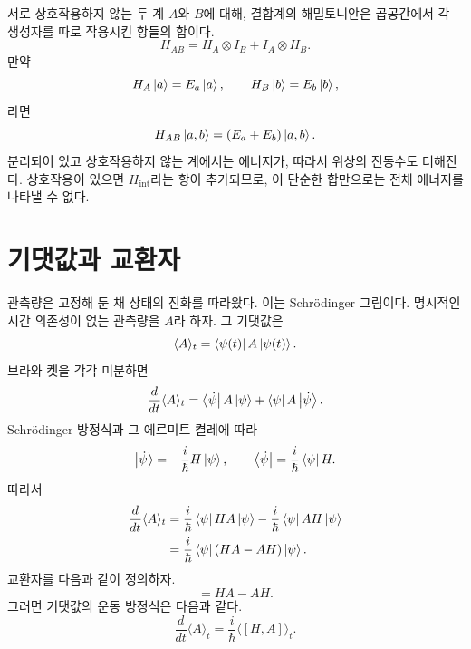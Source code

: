 서로 상호작용하지 않는 두 계 \(A\)와 \(B\)에 대해, 결합계의 해밀토니안은 곱공간에서 각 생성자를 따로 작용시킨 항들의 합이다.
\begin{equation}
H_{AB}
=
H_A\otimes I_B+I_A\otimes H_B.
\end{equation}
만약
\begin{equation}
H_A\left\lvert a\right\rangle=E_a\left\lvert a\right\rangle,
\qquad
H_B\left\lvert b\right\rangle=E_b\left\lvert b\right\rangle,
\end{equation}
라면
\begin{equation}
H_{AB}\left\lvert a,b\right\rangle=(E_a+E_b)\left\lvert a,b\right\rangle.
\end{equation}
분리되어 있고 상호작용하지 않는 계에서는 에너지가, 따라서 위상의 진동수도 더해진다. 상호작용이 있으면 \(H_{\mathrm{int}}\)라는 항이 추가되므로, 이 단순한 합만으로는 전체 에너지를 나타낼 수 없다.

\begin{classroomqa}
\end{classroomqa}

\section{기댓값과 교환자}

관측량은 고정해 둔 채 상태의 진화를 따라왔다. 이는 Schr\"odinger 그림이다. 명시적인 시간 의존성이 없는 관측량을 \(A\)라 하자. 그 기댓값은
\begin{equation}
\langle A\rangle_t
=
\left\langle\psi(t)\right\rvert A\left\lvert\psi(t)\right\rangle.
\end{equation}
브라와 켓을 각각 미분하면
\begin{equation}
\frac{d}{dt}\langle A\rangle_t
=
\left\langle\dot\psi\right\rvert A\left\lvert\psi\right\rangle
+
\left\langle\psi\right\rvert A\left\lvert\dot\psi\right\rangle.
\end{equation}
Schr\"odinger 방정식과 그 에르미트 켤레에 따라
\begin{equation}
\left\lvert\dot\psi\right\rangle
=-\frac{i}{\hbar}H\left\lvert\psi\right\rangle,
\qquad
\left\langle\dot\psi\right\rvert
=\frac{i}{\hbar}\left\langle\psi\right\rvert H.
\end{equation}
따라서
\begin{align}
\frac{d}{dt}\langle A\rangle_t
&=
\frac{i}{\hbar}\left\langle\psi\right\rvert HA\left\lvert\psi\right\rangle
-\frac{i}{\hbar}\left\langle\psi\right\rvert AH\left\lvert\psi\right\rangle \\
&=
\frac{i}{\hbar}\left\langle\psi\right\rvert(HA-AH)\left\lvert\psi\right\rangle.
\end{align}
교환자를 다음과 같이 정의하자.
\begin{equation}
[H,A]=HA-AH.
\end{equation}
그러면 기댓값의 운동 방정식은 다음과 같다.
\begin{equation}
\boxed{
\frac{d}{dt}\langle A\rangle_t
=
\frac{i}{\hbar}\langle[H,A]\rangle_t
}.
\end{equation}


